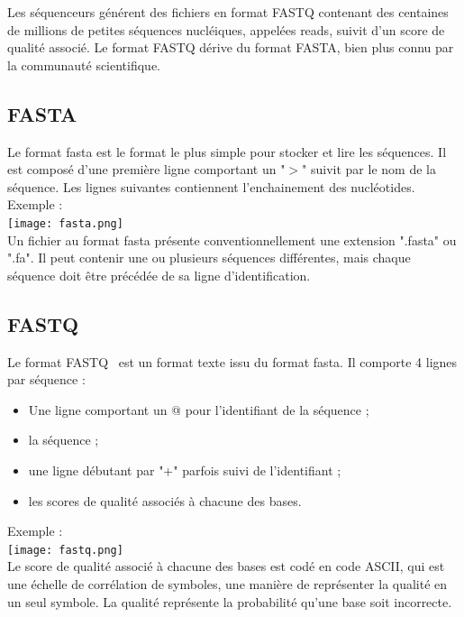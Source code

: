 \documentclass[a4paper,12pt]{article}
\begin{document}
Les séquenceurs générent des fichiers en format FASTQ contenant des centaines de millions de petites séquences nucléiques, appelées reads, suivit d'un score de qualité associé. Le format FASTQ dérive du format FASTA, bien plus connu par la communauté scientifique. 

\subsection{FASTA}
Le format fasta est le format le plus simple pour stocker et lire les séquences. Il est composé d'une première ligne comportant un "$>$" suivit par le nom de la séquence. Les lignes suivantes contiennent l'enchainement des nucléotides. \\


Exemple : \\

\texttt{[image: fasta.png]}~\\

Un fichier au format fasta présente conventionnellement une extension ".fasta" ou ".fa". Il peut contenir une ou plusieurs séquences différentes, mais chaque séquence doit être précédée de sa ligne d'identification. 

\subsection{FASTQ}

Le format FASTQ~\cite{fastq} est un format texte issu du format fasta. Il comporte 4 lignes par séquence :
\begin{itemize}
\item Une ligne comportant un @ pour l'identifiant de la séquence ;
\item la séquence ;
\item une ligne débutant par "+" parfois suivi de l’identifiant ;
\item les scores de qualité associés à chacune des bases.
\end{itemize}
\clearpage
Exemple : \\

\texttt{[image: fastq.png]}~\\

Le score de qualité associé à chacune des bases est codé en code ASCII, qui est une échelle de corrélation de symboles, une manière de représenter la qualité en un seul symbole. La qualité représente la probabilité qu'une base soit incorrecte. \\
\end{document}
